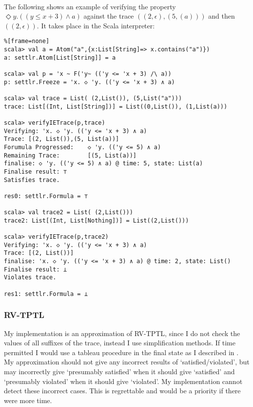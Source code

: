 \documentclass[a4paper]{article}
\begin{document}
\begin{eg}\label{ieverifyeg}~\\
  The following shows an example of verifying the property $\Diamond y. ((y\leq x + 3) \land a)$ against the trace $((2,\epsilon),(5,(a)))$ and then $((2,\epsilon))$. It takes place in the Scala interpreter:
\begin{lstlisting}%[frame=none]
scala> val a = Atom("a",{x:List[String]=> x.contains("a")})
a: settlr.Atom[List[String]] = a

scala> val p = 'x ~ F('y~ (('y <= 'x + 3) /\ a))
p: settlr.Freeze = 'x. ◇ 'y. (('y <= 'x + 3) ∧ a)

scala> val trace = List( (2,List()), (5,List("a")))
trace: List[(Int, List[String])] = List((0,List()), (1,List(a)))

scala> verifyIETrace(p,trace)
Verifying: 'x. ◇ 'y. (('y <= 'x + 3) ∧ a)
Trace: [(2, List()),(5, List(a))]
Forumula Progressed:    ◇ 'y. (('y <= 5) ∧ a)
Remaining Trace:        [(5, List(a))]
finalise: ◇ 'y. (('y <= 5) ∧ a) @ time: 5, state: List(a)
Finalise result: ⊤
Satisfies trace.

res0: settlr.Formula = ⊤

scala> val trace2 = List( (2,List()))
trace2: List[(Int, List[Nothing])] = List((2,List()))

scala> verifyIETrace(p,trace2)
Verifying: 'x. ◇ 'y. (('y <= 'x + 3) ∧ a)
Trace: [(2, List())]
finalise: 'x. ◇ 'y. (('y <= 'x + 3) ∧ a) @ time: 2, state: List()
Finalise result: ⊥
Violates trace.

res1: settlr.Formula = ⊥
\end{lstlisting}
\end{eg}

\subsubsection{RV-TPTL}\label{rvimp}
My implementation is an approximation of RV-TPTL, since I do not check the values of all suffixes of the trace, instead I use simplification methods. If time permitted I would use a tableau procedure in the final state as I described in . My approximation should not give any incorrect results of `satisfied/violated', but may incorrectly give `presumably satisfied' when it should give `satisfied' and `presumably violated' when it should give `violated'. My implementation cannot detect these incorrect cases. This is regrettable and would be a priority if there were more time.
\end{document}
